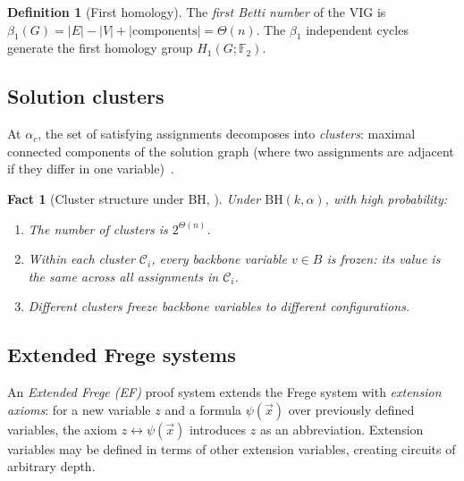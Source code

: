 \documentclass[11pt]{article}
\newtheorem{fact}[theorem]{Fact}
\theoremstyle{definition}
\newtheorem{definition}[theorem]{Definition}
\newcommand{\FF}{\mathbb{F}}
\begin{document}
\begin{definition}[First homology]\label{def:homology}
The \emph{first Betti number} of the VIG is $\beta_1(G) = |E| - |V| +
|\text{components}| = \Theta(n)$.  The $\beta_1$ independent cycles
generate the first homology group $H_1(G; \FF_2)$.
\end{definition}

\subsection{Solution clusters}

At $\alpha_c$, the set of satisfying assignments decomposes into
\emph{clusters}: maximal connected components of the solution graph
(where two assignments are adjacent if they differ in one
variable)~\cite{MezardParisi2002,AchlioptasCoja2008}.

\begin{fact}[Cluster structure under BH, {\cite{DingSly2015,AchlioptasCoja2008}}]\label{fact:clusters}
Under $\mathrm{BH}(k, \alpha)$, with high probability:
\begin{enumerate}[label=(\roman*)]
\item The number of clusters is $2^{\Theta(n)}$.
\item Within each cluster $\mathcal{C}_i$, every backbone variable
$v \in B$ is \emph{frozen}: its value is the same across all
assignments in $\mathcal{C}_i$.
\item Different clusters freeze backbone variables to different
configurations.
\end{enumerate}
\end{fact}

\subsection{Extended Frege systems}

An \emph{Extended Frege (EF)} proof system extends the Frege system
with \emph{extension axioms}: for a new variable $z$ and a formula
$\psi(\vec{x})$ over previously defined variables, the axiom
$z \leftrightarrow \psi(\vec{x})$ introduces $z$ as an abbreviation.
Extension variables may be defined in terms of other extension
variables, creating circuits of arbitrary depth.
\end{document}
